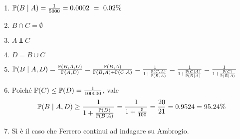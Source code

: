 \Soluzione

\Soluzione

\Soluzione

\Soluzione

\begin{enumerate}
	\item $\mathbb{P}(B\mid A) =\frac{1}{5000} =0.0002\ =\ 0.02\%$
	\item $B\cap C=\emptyset $
	\item $A\Bot C$
	\item $D=B\cup C$
	\item $\mathbb{P}(B\mid A,D) =\frac{\mathbb{P}(B,A,D)}{\mathbb{P}(A,D)} =\frac{\mathbb{P}(B,A)}{\mathbb{P}(B,A) +\mathbb{P}(C,A)} =\frac{1}{1+\frac{\mathbb{P}(C,A)}{\mathbb{P}(B,A)}} =\frac{1}{1+\frac{\mathbb{P}(C\mid A)}{\mathbb{P}(B\mid A)}} =\frac{1}{1+\frac{\mathbb{P}(C)}{\mathbb{P}(B\mid A)}}$
	\item Poiché $\mathbb{P}(C) \leq \mathbb{P}(D) =\frac{1}{100000}$, vale
	\begin{equation*}
		\mathbb{P}(B\mid A,D) \geq \frac{1}{1+\frac{\mathbb{P}(D)}{\mathbb{P}(B\mid A)}} =\frac{1}{1+\frac{5}{100}} =\frac{20}{21} =0.9524=95.24\%
	\end{equation*}
	\item Sì è il caso che Ferrero continui ad indagare su Ambrogio.
\end{enumerate}

\Soluzione

